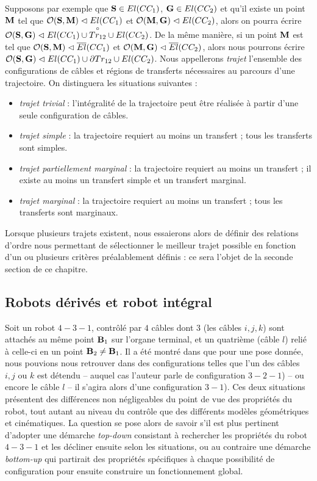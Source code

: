 Supposons par exemple que ${\bf S} \in El(CC_1)$, ${\bf G} \in El(CC_2)$ et qu'il existe un point ${\bf M}$ tel que $\mathcal O({\bf S}, {\bf M}) \vartriangleleft
El(CC_1)$ et $\mathcal O({\bf M}, {\bf G}) \vartriangleleft El(CC_2)$, alors on pourra écrire $\mathcal O({\bf S}, {\bf G}) \vartriangleleft El(CC_1) \cup \overset{\circ}{Tr_{12}} \cup El(CC_2)$. De la même manière, si un point ${\bf M}$ est tel que $\mathcal O({\bf S}, {\bf M}) \vartriangleleft
\overline{El}(CC_1)$ et $\mathcal O({\bf M}, {\bf G}) \vartriangleleft \overline{El}(CC_2)$, alors nous pourrons écrire $\mathcal O({\bf S}, {\bf G}) \vartriangleleft El(CC_1) \cup \partial Tr_{12} \cup El(CC_2)$. Nous appellerons {\it trajet} l'ensemble des configurations de c\^ables et régions de transferts nécessaires au parcours d'une trajectoire. On distinguera les situations suivantes :
\begin{itemize}
 \item {\it trajet trivial} : l'intégralité de la trajectoire peut être réalisée à partir d'une seule configuration de câbles.
 \item {\it trajet simple} : la trajectoire requiert au moins un transfert ; tous les transferts sont simples.
 \item {\it trajet partiellement marginal} : la trajectoire requiert au moins un transfert ; il existe au moins un transfert simple et un transfert marginal.
 \item {\it trajet marginal} : la trajectoire requiert au moins un transfert ; tous les transferts sont marginaux.
\end{itemize}

Lorsque plusieurs trajets existent, nous essaierons alors de définir des relations d'ordre nous permettant de sélectionner le meilleur trajet possible en fonction d'un ou plusieurs critères préalablement définis : ce sera l'objet de la seconde section de ce chapitre.

\subsection{Robots d\'eriv\'es et robot int\'egral}

Soit un robot $4-3-1$, contrôlé par $4$ câbles dont $3$ (les câbles $i, j, k$) sont attachés au même point ${\bf B}_1$ sur l'organe terminal, et un quatrième (câble $l$) relié à celle-ci en un point ${\bf B}_2 \neq {\bf B}_1$. Il a été montré dans \cite{merlet2013-431} que pour une pose donnée, nous pouvions nous retrouver dans des configurations telles que l'un des câbles $i, j$ ou $k$ est détendu -- auquel cas l'auteur parle de configuration $3-2-1$) -- ou encore le câble $l$ -- il s'agira alors d'une configuration $3-1$). Ces deux situations présentent des différences non négligeables du point de vue des propriétés du robot, tout autant au niveau du contrôle que des différents modèles géométriques et cinématiques. La question se pose alors de savoir s'il est plus pertinent d'adopter une démarche {\it top-down} consistant à rechercher les propriétés du robot $4-3-1$ et les décliner ensuite selon les situations, ou au contraire une démarche {\it bottom-up} qui partirait des propriétés spécifiques à chaque possibilité de configuration pour ensuite construire un fonctionnement global.

